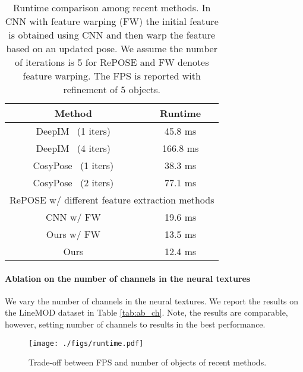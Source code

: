 \documentclass[10pt,twocolumn,letterpaper]{article}
\begin{document}
\begin{table}[t]
 \centering
 \caption{Runtime comparison among recent methods. In CNN with feature warping (FW) the initial feature is obtained using CNN and then warp the feature based on an updated pose. We assume the number of iterations is 5 for RePOSE and FW denotes feature warping. The FPS is reported with refinement of 5 objects.}
 \vspace{0.2cm}
 \label{tab:comp_strat}
 \begin{tabular}{|c||c|}
   \hline
   Method & Runtime \\ \hline
   DeepIM~\cite{li2018deepim} (1 iters) & 45.8 ms          \\
   DeepIM~\cite{li2018deepim} (4 iters) & 166.8 ms          \\
   CosyPose~\cite{labbe2020} (1 iters) & 38.3 ms          \\
   CosyPose~\cite{labbe2020} (2 iters) & 77.1 ms          \\ \hline
   \multicolumn{2}{|c|}{RePOSE w/ different feature extraction methods}           \\ \hline
   CNN w/ FW   & 19.6 ms         \\
   Ours w/ FW    & 13.5 ms         \\
   Ours & 12.4 ms \\ \hline
 \end{tabular}
\end{table}

\paragraph{Ablation on the number of channels in the neural textures}
We vary the number of channels in the neural textures. We report the results on the LineMOD dataset in Table \ref{tab:ab_ch}. Note, the results are comparable, however, setting number of channels to  results in the best performance.

\begin{figure}[t]
  \centering
  \hspace*{-0.4cm}
  \texttt{[image: ./figs/runtime.pdf]}
  \caption{Trade-off between FPS and number of objects of recent methods.}
  \label{fig:runtime}
\end{figure}
\end{document}
